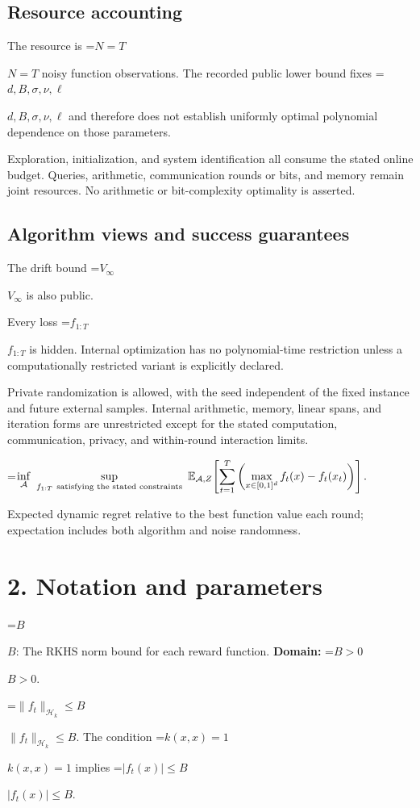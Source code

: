 \documentclass[10pt,a4paper]{article}
\newcommand{\AtlasMath}[1]{\par\begingroup\centering\setbox0=\hbox{$\displaystyle #1$}\ifdim\wd0>1.4\linewidth\typeout{ATLAS WIDE FORMULA: \the\wd0}\fi\ifdim\wd0>\linewidth\resizebox{\linewidth}{!}{\box0}\else\box0\fi\par\endgroup}
\newcommand{\AtlasInlineMath}[1]{\begingroup\setbox0=\hbox{$#1$}\ifdim\wd0>.4\linewidth\endgroup\AtlasMath{#1}\else\endgroup$#1$\fi}
\begin{document}
\subsection{Resource accounting}
The resource is \AtlasInlineMath{N=T} noisy function observations. The recorded public lower bound fixes \AtlasInlineMath{d,B,\sigma,\nu,\ell} and therefore does not establish uniformly optimal polynomial dependence on those parameters.

Exploration, initialization, and system identification all consume the stated online budget. Queries, arithmetic, communication rounds or bits, and memory remain joint resources. No arithmetic or bit-complexity optimality is asserted.

\subsection{Algorithm views and success guarantees}
The drift bound \AtlasInlineMath{V_\infty} is also public.

Every loss \AtlasInlineMath{f_{1:T}} is hidden. Internal optimization has no polynomial-time restriction unless a computationally restricted variant is explicitly declared.

Private randomization is allowed, with the seed independent of the fixed instance and future external samples. Internal arithmetic, memory, linear spans, and iteration forms are unrestricted except for the stated computation, communication, privacy, and within-round interaction limits.


\AtlasMath{\inf_{\mathcal{A}}\ \sup_{f_{1:T}\ \text{\text{satisfying the stated constraints}}}\ \mathbb{E}_{\mathcal{A},Z}\!\left[\sum_{t=1}^{T}\left(\max_{x\in[0,1]^d}f_t(x)-f_t(x_t)\right)\right].}


Expected dynamic regret relative to the best function value each round; expectation includes both algorithm and noise randomness.

\section{2. Notation and parameters}
\AtlasInlineMath{B}: The RKHS norm bound for each reward function. \textbf{Domain:} \AtlasInlineMath{B>0}.

\AtlasInlineMath{\|f_t\|_{\mathcal H_k}\le B}. The condition \AtlasInlineMath{k(x,x)=1} implies \AtlasInlineMath{|f_t(x)|\le B}.
\end{document}
